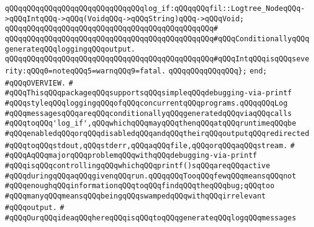 \newline
\newline
\verb|qQQqqQQqqQQqqQQqqQQqqQQqqQQqqQQqlog_if:qQQqqQQqfil::Logtree_NodeqQQq->qQQqIntqQQq->qQQq(VoidqQQq->qQQqString)qQQq->qQQqVoid;|\newline
\verb|qQQqqQQqqQQqqQQqqQQqqQQqqQQqqQQqqQQqqQQqqQQqqQQq#|\newline
\verb|qQQqqQQqqQQqqQQqqQQqqQQqqQQqqQQqqQQqqQQqqQQqqQQq#qQQqConditionallyqQQqgenerateqQQqloggingqQQqoutput.|\newline
\verb|qQQqqQQqqQQqqQQqqQQqqQQqqQQqqQQqqQQqqQQqqQQqqQQq#qQQqIntqQQqisqQQqseverity:qQQq0=noteqQQq5=warnqQQq9=fatal.|\newline
\newline
\verb|qQQqqQQqqQQqqQQq};|\newline
\verb|end;|\newline
\newline
\verb|#qQQqOVERVIEW.|\newline
\verb|#|\newline
\verb|#qQQqThisqQQqpackageqQQqsupportsqQQqsimpleqQQqdebugging-via-printf|\newline
\verb|#qQQqstyleqQQqloggingqQQqofqQQqconcurrentqQQqprograms.qQQqqQQqLog|\newline
\verb|#qQQqmessagesqQQqareqQQqconditionallyqQQqgeneratedqQQqviaqQQqcalls|\newline
\verb|#qQQqtoqQQq'log_if',qQQqwhichqQQqmayqQQqthenqQQqatqQQqruntimeqQQqbe|\newline
\verb|#qQQqenabledqQQqorqQQqdisabledqQQqandqQQqtheirqQQqoutputqQQqredirected|\newline
\verb|#qQQqtoqQQqstdout,qQQqstderr,qQQqaqQQqfile,qQQqorqQQqaqQQqstream.|\newline
\verb|#|\newline
\verb|#qQQqAqQQqmajorqQQqproblemqQQqwithqQQqdebugging-via-printf|\newline
\verb|#qQQqisqQQqcontrollingqQQqwhichqQQqprintf()sqQQqareqQQqactive|\newline
\verb|#qQQqduringqQQqaqQQqgivenqQQqrun.qQQqqQQqTooqQQqfewqQQqmeansqQQqnot|\newline
\verb|#qQQqenoughqQQqinformationqQQqtoqQQqfindqQQqtheqQQqbug;qQQqtoo|\newline
\verb|#qQQqmanyqQQqmeansqQQqbeingqQQqswampedqQQqwithqQQqirrelevant|\newline
\verb|#qQQqoutput.|\newline
\verb|#|\newline
\verb|#qQQqOurqQQqideaqQQqhereqQQqisqQQqtoqQQqgenerateqQQqlogqQQqmessages|\newline
